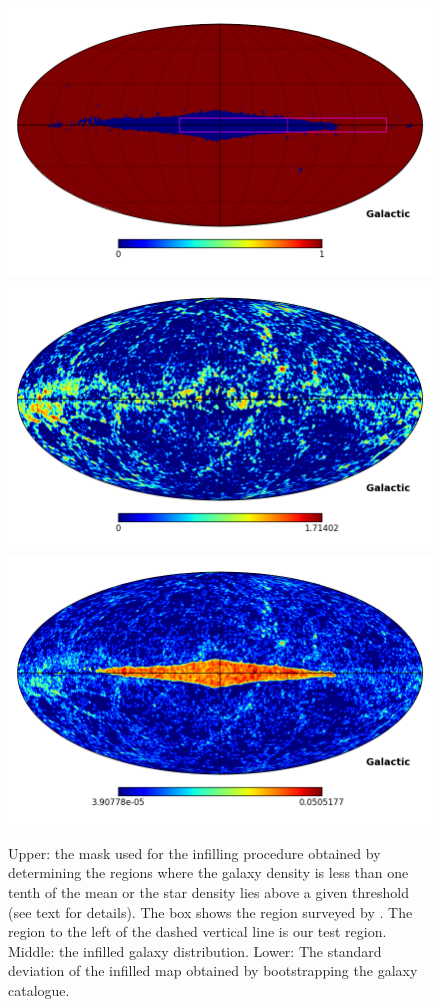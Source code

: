 \documentclass[useAMS,usenatbib]{mn2e}
\begin{document}
\begin{figure}
  \includegraphics[width=\columnwidth,clip,trim=0 1in 0 0]{prod_mask}
  \includegraphics[width=\columnwidth]{infilled_prod_mask}
  \includegraphics[width=\columnwidth]{sigma_prod_mask}
  \caption{Upper: the mask used for the infilling procedure obtained
    by determining the regions where the galaxy density is less than
    one tenth of the mean or the star density lies above a given
    threshold (see text for details).  The box shows the region surveyed by
    \citep{2016AJ....151...52S}.  The region to the left of the dashed vertical line
    is our test region.    Middle: the infilled galaxy
    distribution. Lower: The standard deviation of the infilled map
    obtained by bootstrapping the galaxy catalogue.}
  \label{fig:infilling}
\end{figure}
\end{document}
